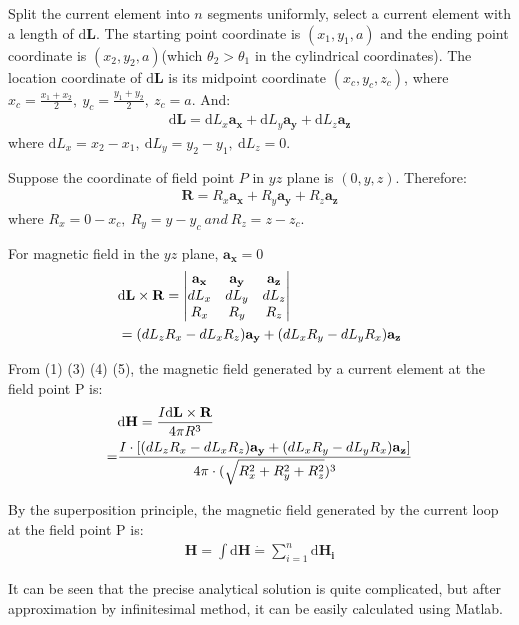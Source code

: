 \documentclass[journal,twocolumn,letterpaper]{IEEEJERM}
\begin{document}
Split the current element into $ n $ segments uniformly, select a current element with a length of $ \mathrm{d}\mathbf{L} $. The starting point coordinate is $ (x_1,y_1,a) $ and the ending point coordinate is $ (x_2,y_2,a) $(which $\theta_2>\theta_1$ in the cylindrical coordinates). The location coordinate of $ \mathrm{d}\mathbf{L} $ is its midpoint coordinate $ (x_c,y_c,z_c) $, where $ x_c=\frac{x_1+x_2}{2},\ y_c=\frac{y_1+y_2}{2},\ z_c=a $. And:
\begin{align}
\mathrm{d}\mathbf{L}=\mathrm{d}L_x\mathbf{a_x}+\mathrm{d}L_y\mathbf{a_y}+\mathrm{d}L_z\mathbf{a_z}
\end{align}
where $ \mathrm{d}L_x =x_2-x_1,\  \mathrm{d}L_y=y_2-y_1,\  \mathrm{d}L_z=0$. 

Suppose the coordinate of field point $ P $ in $ yz $ plane is $ (0,y,z) $. Therefore:
\begin{align}
\mathbf{R}=R_x\mathbf{a_x}+R_y\mathbf{a_y}+R_z\mathbf{a_z}
\end{align}
where $ R_x=0-x_c,\ R_y=y-y_c\ and\ R_z=z-z_c $.

For magnetic field in  the $ yz $ plane, $ \mathbf{a_x}=0 $
\begin{align}
&\mathrm{d}\mathbf{L}\times \mathbf{R}=
\begin{vmatrix}
\mathbf{a_x}&\mathbf{a_y}&\mathbf{a_z}\\
dL_x&dL_y&dL_z\\
R_x&R_y&R_z
\end{vmatrix}\\
&=(dL_zR_x-dL_xR_z)\mathbf{a_y}+(dL_xR_y-dL_yR_x)\mathbf{a_z} \notag
\end{align}

From (1) (3) (4) (5), the magnetic field generated by a current element at the field point P is:
\begin{align}
&\mathrm{d}\mathbf{H}=\dfrac{I\mathrm{d}\mathbf{L}\times \mathbf{R}}{4\pi R^3}\\
=&\dfrac{I\cdot[ (dL_zR_x-dL_xR_z)\mathbf{a_y}+(dL_xR_y-dL_yR_x)\mathbf{a_z}]}{4\pi\cdot (\sqrt{R_x^2+R_y^2+R_z^2})^3} \notag
\end{align}

By the superposition principle, the magnetic field generated by the current loop at the field point P is:
\begin{align}
\mathbf{H}=\int \mathrm{d}\mathbf{H}\dot{=}\sum\limits_{i=1}^n \mathrm{d}\mathbf{H_i}
\end{align}

It can be seen that the precise analytical solution is quite complicated, but after approximation by infinitesimal method, it can be easily calculated using Matlab.
\end{document}
